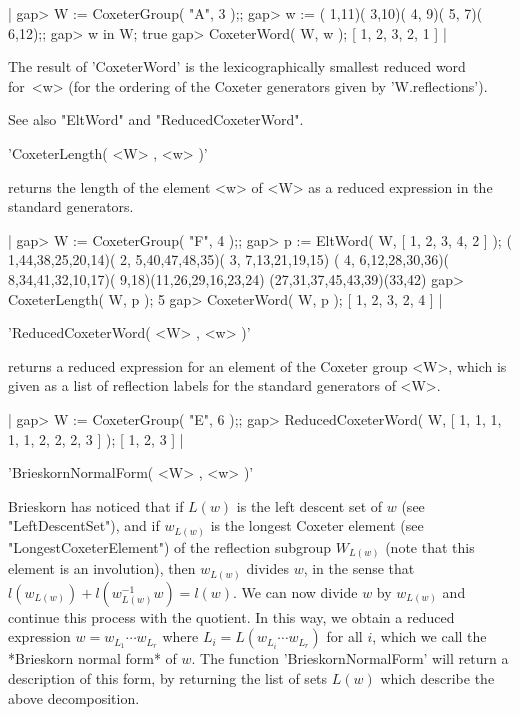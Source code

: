 |    gap> W := CoxeterGroup( "A", 3 );;
    gap> w := ( 1,11)( 3,10)( 4, 9)( 5, 7)( 6,12);;
    gap> w in W;
    true
    gap> CoxeterWord( W, w );
    [ 1, 2, 3, 2, 1 ] |

The result  of 'CoxeterWord'  is the lexicographically  smallest reduced
word  for~<w> (for  the  ordering  of the  Coxeter  generators given  by
'W.reflections').

See also "EltWord" and "ReducedCoxeterWord".


'CoxeterLength( <W> , <w> )'

returns the length of the element <w>  of <W> as a reduced expression in
the standard generators.

|    gap> W := CoxeterGroup( "F", 4 );;
    gap> p := EltWord( W, [ 1, 2, 3, 4, 2 ] );
    ( 1,44,38,25,20,14)( 2, 5,40,47,48,35)( 3, 7,13,21,19,15)
    ( 4, 6,12,28,30,36)( 8,34,41,32,10,17)( 9,18)(11,26,29,16,23,24)
    (27,31,37,45,43,39)(33,42)
    gap> CoxeterLength( W, p );
    5
    gap> CoxeterWord( W, p );
    [ 1, 2, 3, 2, 4 ] |


'ReducedCoxeterWord( <W> , <w> )'

returns a  reduced expression for an  element of the Coxeter  group <W>,
which is  given as a {\GAP}  list of reflection labels  for the standard
generators of <W>.

|    gap> W := CoxeterGroup( "E", 6 );;
    gap> ReducedCoxeterWord( W, [ 1, 1, 1, 1, 1, 2, 2, 2, 3 ] );
    [ 1, 2, 3 ] |


'BrieskornNormalForm( <W> , <w> )'

Brieskorn \cite{Bri71}  has noticed that  if $L(w)$ is the  left descent
set  of $w$  (see "LeftDescentSet"),  and if  $w_{L(w)}$ is  the longest
Coxeter element (see "LongestCoxeterElement") of the reflection subgroup
$W_{L(w)}$ (note that this  element is  an involution),  then $w_{L(w)}$
divides  $w$, in  the  sense that  $l(w_{L(w)})+l(w_{L(w)}^{-1}w)=l(w)$.
We  can  now  divide  $w$   by  $w_{L(w)}$  and  continue  this  process
with  the  quotient.  In  this  way,  we  obtain  a  reduced  expression
$w=w_{L_1}  \cdots w_{L_r}$  where $L_i=L(w_{L_i}  \cdots w_{L_r})$  for
all  $i$,  which  we  call  the *Brieskorn  normal  form*  of  $w$.  The
function 'BrieskornNormalForm'  will return a description  of this form,
by  returning  the  list  of   sets  $L(w)$  which  describe  the  above
decomposition.

